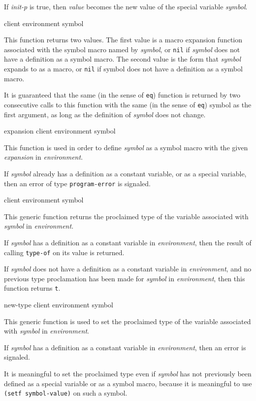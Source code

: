 If \textit{init-p} is true, then \textit{value} becomes the new value
of the special variable \textit{symbol}.

 {client environment symbol}

This function returns two values.  The first value is a macro
expansion function associated with the symbol macro named by
\textit{symbol}, or \texttt{nil} if \textit{symbol} does not have a
definition as a symbol macro.  The second value is the form that
\textit{symbol} expands to as a macro, or \texttt{nil} if symbol does
not have a definition as a symbol macro.

It is guaranteed that the same (in the sense of \texttt{eq}) function
is returned by two consecutive calls to this function with the same
(in the sense of \texttt{eq})
symbol as the first argument, as long as the definition of
\textit{symbol} does not change.

 {expansion client environment symbol}

This function is used in order to define \textit{symbol} as a symbol
macro with the given \textit{expansion} in \textit{environment}.

If \textit{symbol} already has a definition as a constant variable, or
as a special variable, then an error of type \texttt{program-error} is
signaled.

 {client environment symbol}

This generic function returns the proclaimed type of the variable
associated with \textit{symbol} in \textit{environment}.

If \textit{symbol} has a definition as a constant variable in
\textit{environment}, then the result of calling \texttt{type-of} on
its value is returned.

If \textit{symbol} does not have a definition as a constant variable
in \textit{environment}, and no previous type proclamation has been
made for \textit{symbol} in \textit{environment}, then this function
returns \texttt{t}.

 {new-type client environment symbol}

This generic function is used to set the proclaimed type of the
variable associated with \textit{symbol} in \textit{environment}.

If \textit{symbol} has a definition as a constant variable in
\textit{environment}, then an error is signaled.

It is meaningful to set the proclaimed type even if \textit{symbol}
has not previously been defined as a special variable or as a symbol
macro, because it is meaningful to use \texttt{(setf symbol-value)} on
such a symbol.

